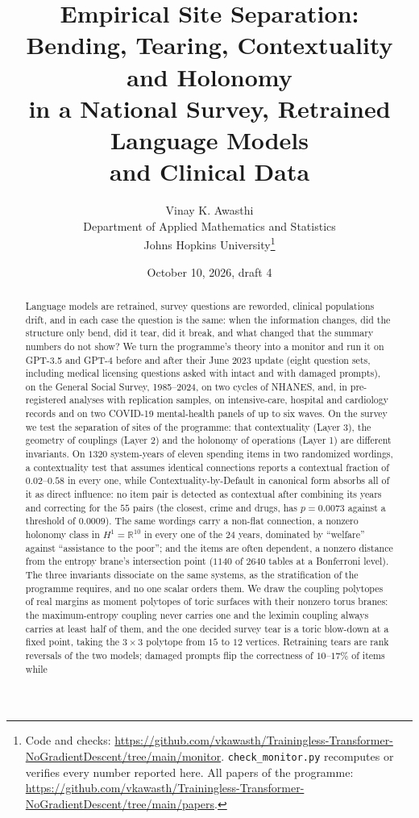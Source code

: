 \documentclass[11pt]{article}
\title{Empirical Site Separation:\\ Bending, Tearing, Contextuality and Holonomy\\ in a National Survey, Retrained Language Models\\ and Clinical Data}
\author{Vinay K. Awasthi\\
Department of Applied Mathematics and Statistics\\
Johns Hopkins University\thanks{Code and checks: \url{https://github.com/vkawasth/Trainingless-Transformer-NoGradientDescent/tree/main/monitor}.
\texttt{check\_monitor.py} recomputes or verifies every number reported here. All papers of the programme:
\url{https://github.com/vkawasth/Trainingless-Transformer-NoGradientDescent/tree/main/papers}.}}
\date{October 10, 2026, draft 4}
\theoremstyle{definition}
\theoremstyle{remark}
\begin{document}
\maketitle

\begin{abstract}
Language models are retrained, survey questions are reworded, clinical populations drift, and in each case the question is the same:
when the information changes, did the structure only bend, did it tear, did it break, and what changed that the summary numbers do not
show? We turn the programme's theory into a monitor and run it on GPT-3.5 and GPT-4 before and after their June 2023 update (eight
question sets, including medical licensing questions asked with intact and with damaged prompts), on the General Social Survey,
1985--2024, on two cycles of NHANES, and, in pre-registered analyses with replication samples, on intensive-care, hospital and
cardiology records and on two COVID-19 mental-health panels of up to six waves. On the survey we test the separation of sites of the programme: that contextuality (Layer 3),
the geometry of couplings (Layer 2) and the holonomy of operations (Layer 1) are different invariants. On $1320$ system-years of eleven
spending items in two randomized wordings, a contextuality test that assumes identical connections reports a contextual fraction of
$0.02$--$0.58$ in every one, while Contextuality-by-Default in canonical form absorbs all of it as direct influence: no item pair is
detected as contextual after combining its years and correcting for the $55$ pairs (the closest, crime and drugs, has $p=0.0073$
against a threshold of $0.0009$). The same wordings carry a
non-flat connection, a nonzero holonomy class in $H^1=\mathbb R^{10}$ in every one of the $24$ years, dominated by ``welfare'' against
``assistance to the poor''; and the items are often dependent, a nonzero distance from the entropy brane's intersection point ($1140$ of $2640$ tables at a
Bonferroni level).
The three invariants dissociate on the same systems, as the stratification of the programme requires, and no one scalar orders them. We draw the coupling polytopes of real margins as moment
polytopes of toric surfaces with their nonzero torus branes: the maximum-entropy coupling never carries one and the leximin coupling
always carries at least half of them, and the one decided survey tear is a toric blow-down at a fixed point, taking the $3\times3$
polytope from $15$ to $12$ vertices. Retraining tears are rank reversals of the two models; damaged prompts flip the correctness of $10$--$17\%$ of items while

\end{abstract}
\end{document}
